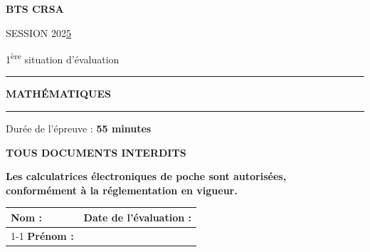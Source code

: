 \documentclass[a4paper,11pt]{article}
\begin{document}

\thispagestyle{empty}

\begin{center}
    \vspace*{0.2cm}
    {\Huge\bfseries\textcolor{uimm-blue}{BTS CRSA}}
    \vspace{0.4cm}

    {\large SESSION 202\underline{5}}
    \vspace{0.2cm}

    {\large 1\textsuperscript{ère} situation d'évaluation}
    \vspace{0.6cm}

    \noindent\rule{\linewidth}{1.5pt}
    \vspace{0.3cm}
    {\Huge\bfseries\textcolor{uimm-blue}{MATHÉMATIQUES}}
    \vspace{0.3cm}
    \noindent\rule{\linewidth}{1.5pt}

    \vspace{0.6cm}
    {\large Durée de l'épreuve : \textbf{55 minutes}}
    \vspace{0.4cm}

    \begin{tcolorbox}[colback=light-gray, colframe=uimm-blue, boxrule=1pt, arc=4pt, width=10cm, halign=center]
        {\large\bfseries TOUS DOCUMENTS INTERDITS}
    \end{tcolorbox}

    \vspace{0.4cm}
    \textbf{Les calculatrices électroniques de poche sont autorisées,}\\
    \textbf{conformément à la réglementation en vigueur.}
\end{center}

\vspace{0.6cm}

\noindent
\begin{tabularx}{\linewidth}{|X|l|}
\hline
\rowcolor{light-gray}
\textbf{Nom :} & \multirow{2}{*}{\textbf{Date de l'évaluation :}} \\
\cline{1-1}
\rowcolor{light-gray}
\textbf{Prénom :} & \\
\hline
\end{tabularx}

\vspace{0.6cm}
\end{document}
